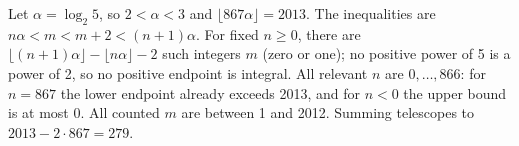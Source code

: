 Let $\alpha=\log_2 5$, so $2<\alpha<3$ and $\lfloor867\alpha\rfloor=2013$. The inequalities are $n\alpha<m<m+2<(n+1)\alpha$. For fixed $n\ge0$, there are $\lfloor(n+1)\alpha\rfloor-\lfloor n\alpha\rfloor-2$ such integers $m$ (zero or one); no positive power of 5 is a power of 2, so no positive endpoint is integral. All relevant $n$ are $0,\ldots,866$: for $n=867$ the lower endpoint already exceeds 2013, and for $n<0$ the upper bound is at most 0. All counted $m$ are between 1 and 2012. Summing telescopes to $2013-2\cdot867=\boxed{279}$.
